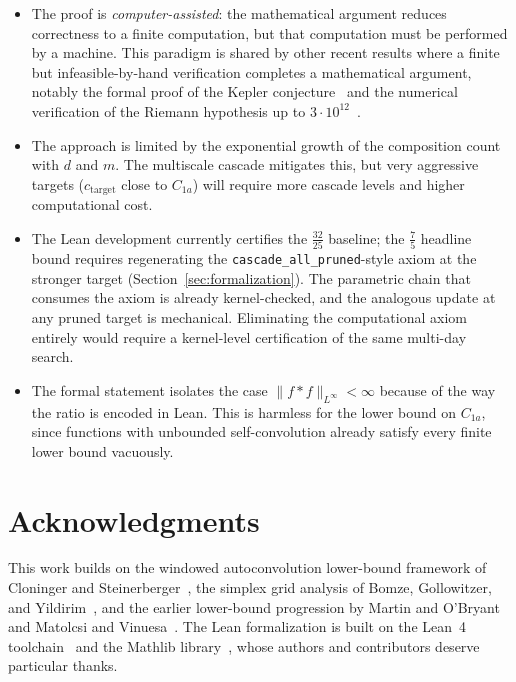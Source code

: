 \documentclass[11pt, letterpaper]{article}
\theoremstyle{paperplain}
\theoremstyle{paperdef}
\begin{document}
\begin{itemize}
  \item The proof is \emph{computer-assisted}: the mathematical
    argument reduces correctness to a finite computation, but that
    computation must be performed by a machine.  This paradigm is shared
    by other recent results where a finite but infeasible-by-hand
    verification completes a mathematical argument, notably the formal
    proof of the Kepler conjecture~\cite{Hales2017} and the numerical
    verification of the Riemann hypothesis up to
    $3\cdot 10^{12}$~\cite{PlattTrudgian2021}.

  \item The approach is limited by the exponential growth of the
    composition count with $d$ and $m$.  The multiscale cascade
    mitigates this, but very aggressive targets
    ($c_{\mathrm{target}}$ close to $C_{1a}$) will require more
    cascade levels and higher computational cost.

  \item The Lean development currently certifies the
    $\tfrac{32}{25}$ baseline; the $\tfrac{7}{5}$ headline bound
    requires regenerating the
    \texttt{cascade\_all\_pruned}-style axiom at the stronger target
    (Section~\ref{sec:formalization}).  The parametric chain that
    consumes the axiom is already kernel-checked, and the analogous
    update at any pruned target is mechanical.  Eliminating the
    computational axiom entirely would require a kernel-level
    certification of the same multi-day search.

  \item The formal statement isolates the case
    $\|f*f\|_{L^\infty} < \infty$ because of the way the ratio is
    encoded in Lean.  This is harmless for the lower bound on
    $C_{1a}$, since functions with unbounded self-convolution already
    satisfy every finite lower bound vacuously.
\end{itemize}


\section*{Acknowledgments}

This work builds on the windowed autoconvolution lower-bound framework
of Cloninger and Steinerberger~\cite{CS17}, the simplex grid analysis
of Bomze, Gollowitzer, and Yildirim~\cite{Bomze2014}, and the earlier
lower-bound progression by Martin and O'Bryant~\cite{MO2007,MO2009}
and Matolcsi and Vinuesa~\cite{MV10}.  The Lean formalization is built
on the Lean~4 toolchain~\cite{Lean4} and the Mathlib
library~\cite{Mathlib}, whose authors and contributors deserve
particular thanks.





\end{document}
